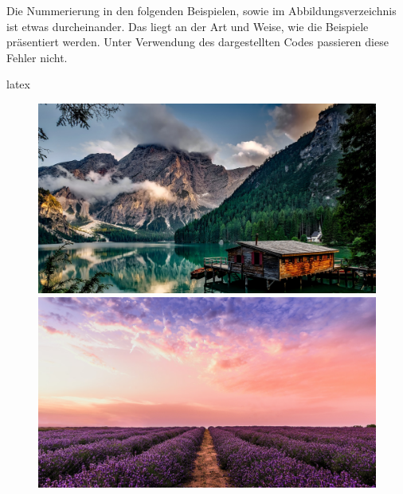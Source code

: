\begin{information}
    Die Nummerierung in den folgenden Beispielen, sowie im Abbildungsverzeichnis ist etwas durcheinander. Das liegt an der Art und Weise, wie die Beispiele präsentiert werden. Unter Verwendung des dargestellten Codes passieren diese Fehler nicht.
\end{information}

\begin{showcase}
    \begin{code}{latex}
        \begin{figure}
            \centering
            \begin{minipage}[c]{0.49\columnwidth}
                \includegraphics[width=\linewidth]{assets/images/bilder/pexels-pixabay-147411.jpg}
            \end{minipage}
            \hfill
            \begin{minipage}[c]{0.49\columnwidth}
                \includegraphics[width=\linewidth]{assets/images/bilder/pexels-david-bartus-1166209.jpg}

\end{minipage}
\end{figure}
\end{code}
\end{showcase}
